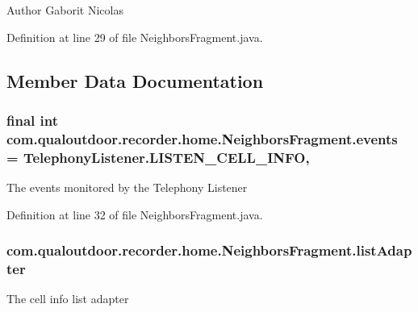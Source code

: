 \begin{DoxyAuthor}{Author}
Gaborit Nicolas 
\end{DoxyAuthor}


Definition at line 29 of file Neighbors\-Fragment.\-java.



\subsection{Member Data Documentation}
\hypertarget{classcom_1_1qualoutdoor_1_1recorder_1_1home_1_1NeighborsFragment_a93d9c9e5a667b7404b65bee5e0015fe5}{
\subsubsection[{events}]{\setlength{\rightskip}{0pt plus 5cm}final int com.\-qualoutdoor.\-recorder.\-home.\-Neighbors\-Fragment.\-events = {\bf Telephony\-Listener.\-L\-I\-S\-T\-E\-N\-\_\-\-C\-E\-L\-L\-\_\-\-I\-N\-F\-O}\hspace{0.3cm}{\ttfamily [static]}, {\ttfamily [private]}}}\label{classcom_1_1qualoutdoor_1_1recorder_1_1home_1_1NeighborsFragment_a93d9c9e5a667b7404b65bee5e0015fe5}
The events monitored by the Telephony Listener 

Definition at line 32 of file Neighbors\-Fragment.\-java.

\hypertarget{classcom_1_1qualoutdoor_1_1recorder_1_1home_1_1NeighborsFragment_afd33755a7a58c67026151f5ce54a124e}{
\subsubsection[{list\-Adapter}]{ com.\-qualoutdoor.\-recorder.\-home.\-Neighbors\-Fragment.\-list\-Adapter\hspace{0.3cm}{\ttfamily [private]}}}\label{classcom_1_1qualoutdoor_1_1recorder_1_1home_1_1NeighborsFragment_afd33755a7a58c67026151f5ce54a124e}
The cell info list adapter 

